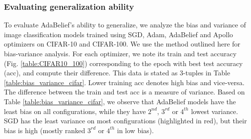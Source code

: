 \subsubsection{ Evaluating generalization ability}
\label{lab:generalization_ability}
To evaluate AdaBelief's ability to generalize, we analyze the bias and variance of image classification models trained using SGD, Adam, AdaBelief and Apollo optimizers on CIFAR-10 and CIFAR-100. We use the method outlined here \cite{ng_deep_nodate} for bias-variance analysis. For each optimizer, we note its train and test accuracy (Fig. \ref{table:CIFAR10_100}) corresponding to the epoch with best test accuracy (acc), and compute their difference. This data is stated as 3-tuples in Table \ref{table:bias_variance_cifar}. Lower training acc denotes high bias and vice-versa. The difference between the train and test acc is a measure of variance. Based on Table \ref{table:bias_variance_cifar}, we observe that AdaBelief models have the least bias on all configurations, while they have $2^{nd}$, $3^{rd}$ or $4^{th}$ lowest variance. SGD has the least variance on most configurations (highlighted in red), but their bias is high (mostly ranked $3^{rd}$ or $4^{th}$ in low bias). 
    
